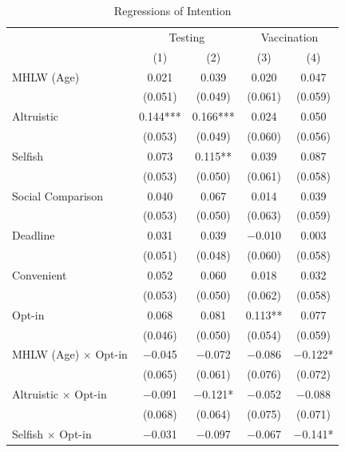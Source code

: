 \documentclass[
]{article}
\begin{document}
\begin{table}

\caption{\label{tab:reg-int}Regressions of Intention}
\centering
\fontsize{9}{11}\selectfont
\begin{threeparttable}
\begin{tabular}[t]{lcccc}
\toprule
\multicolumn{1}{c}{ } & \multicolumn{2}{c}{Testing} & \multicolumn{2}{c}{Vaccination} \\
\cmidrule(l{3pt}r{3pt}){2-3} \cmidrule(l{3pt}r{3pt}){4-5}
  & (1) & (2) & (3) & (4)\\
\midrule
MHLW (Age) & \num{0.021} & \num{0.039} & \num{0.020} & \num{0.047}\\
 & (\num{0.051}) & (\num{0.049}) & (\num{0.061}) & (\num{0.059})\\
Altruistic & \num{0.144}*** & \num{0.166}*** & \num{0.024} & \num{0.050}\\
 & (\num{0.053}) & (\num{0.049}) & (\num{0.060}) & (\num{0.056})\\
Selfish & \num{0.073} & \num{0.115}** & \num{0.039} & \num{0.087}\\
 & (\num{0.053}) & (\num{0.050}) & (\num{0.061}) & (\num{0.058})\\
Social Comparison & \num{0.040} & \num{0.067} & \num{0.014} & \num{0.039}\\
 & (\num{0.053}) & (\num{0.050}) & (\num{0.063}) & (\num{0.059})\\
Deadline & \num{0.031} & \num{0.039} & \num{-0.010} & \num{0.003}\\
 & (\num{0.051}) & (\num{0.048}) & (\num{0.060}) & (\num{0.058})\\
Convenient & \num{0.052} & \num{0.060} & \num{0.018} & \num{0.032}\\
 & (\num{0.053}) & (\num{0.050}) & (\num{0.062}) & (\num{0.058})\\
Opt-in & \num{0.068} & \num{0.081} & \num{0.113}** & \num{0.077}\\
 & (\num{0.046}) & (\num{0.050}) & (\num{0.054}) & (\num{0.059})\\
MHLW (Age) $\times$ Opt-in & \num{-0.045} & \num{-0.072} & \num{-0.086} & \num{-0.122}*\\
 & (\num{0.065}) & (\num{0.061}) & (\num{0.076}) & (\num{0.072})\\
Altruistic $\times$ Opt-in & \num{-0.091} & \num{-0.121}* & \num{-0.052} & \num{-0.088}\\
 & (\num{0.068}) & (\num{0.064}) & (\num{0.075}) & (\num{0.071})\\
Selfish $\times$ Opt-in & \num{-0.031} & \num{-0.097} & \num{-0.067} & \num{-0.141}*\\

\end{tabular}
\end{threeparttable}
\end{table}
\end{document}
